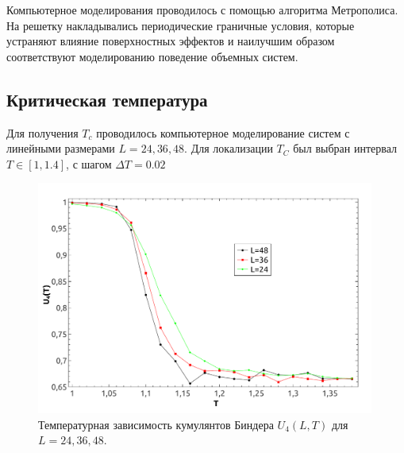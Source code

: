 \documentclass[a4paper,14pt]{extarticle}
\begin{document}
 
 Компьютерное моделирования проводилось с помощью алгоритма Метрополиса. На решетку накладывались периодические граничные условия, которые устраняют влияние поверхностных эффектов и наилучшим образом соответствуют моделированию поведение объемных систем.

\subsection{Критическая температура}
Для получения $T_c$ проводилось компьютерное моделирование систем с линейными размерами $L = 24, 36, 48$. 
Для локализации $T_C$ был выбран интервал $T \in [1, 1.4]$, с шагом $\Delta T = 0.02$

\begin{figure}[H]
	\begin{center}
		\includegraphics[width=0.99\textwidth]{kumfff.pdf}
		\caption{\label{testSolution} Температурная зависимость кумулянтов Биндера $U_4(L,T)$ для $L=24,36,48$.}
	\end{center}
\end{figure}
\end{document}
